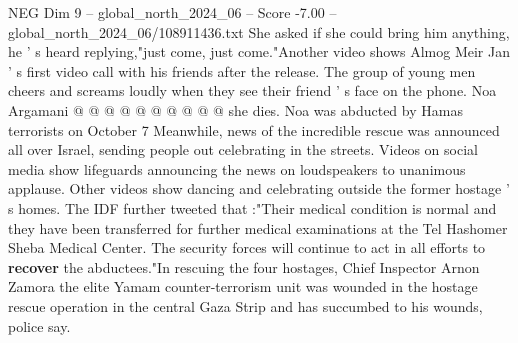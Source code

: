 \begin{textsample}{NEG Dim 9 – global\_north\_2024\_06 – Score -7.00 – global\_north\_2024\_06/108911436.txt}
She asked if she could bring him anything, he ' s heard replying,"just come, just come."Another video shows Almog Meir Jan ' s first video call with his friends after the release.
The group of young men cheers and screams loudly when they see their friend ' s face on the phone.
Noa Argamani @ @ @ @ @ @ @ @ @ @ she dies.
Noa was abducted by Hamas terrorists on October 7 Meanwhile, news of the incredible rescue was announced all over Israel, sending people out celebrating in the streets.
Videos on social media show lifeguards announcing the news on loudspeakers to unanimous applause.
Other videos show dancing and celebrating outside the former hostage ' s homes.
The IDF further tweeted that :"Their medical condition is normal and they have been transferred for further medical examinations at the Tel Hashomer Sheba Medical Center.
The security forces will continue to act in all efforts to \textbf{recover} the abductees."In rescuing the four hostages, Chief Inspector Arnon Zamora the elite Yamam counter-terrorism unit was wounded in the hostage rescue operation in the central Gaza Strip and has succumbed to his wounds, police say.

\end{textsample}
